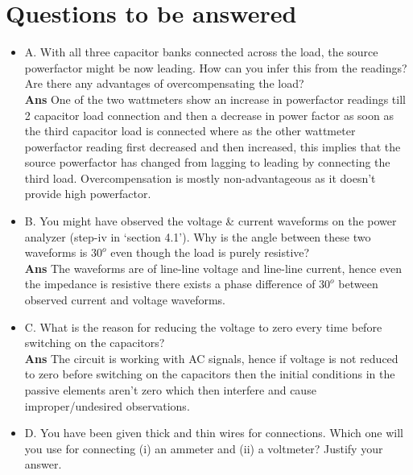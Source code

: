 \documentclass[12pt]{article}
\begin{document}
  \newpage
  
  
  \section{Questions to be answered}
  
  \begin{itemize}
      \item A. With all three capacitor banks connected across the load, the source powerfactor might be now leading. How can you infer this from the readings? Are there any advantages of overcompensating the load?\vspace{0.2cm} \\
      \textbf{Ans} One of the two wattmeters show an increase in powerfactor readings till 2 capacitor load connection and then a decrease in power factor as soon as the third capacitor load is connected where as the other wattmeter powerfactor reading first decreased and then increased, this implies that the source powerfactor has changed from lagging to leading by connecting the third load. Overcompensation is mostly non-advantageous as it doesn't provide high powerfactor.    
      \item B. You might have observed the voltage \& current waveforms on the power analyzer (step-iv in `section 4.1'). Why is the angle between these two waveforms is $30^o$ even though the load is purely resistive? \vspace{0.2cm} \\
      \textbf{Ans} The waveforms are of line-line voltage and line-line current, hence even the impedance is resistive there exists a phase difference of $30^o$ between observed current and voltage waveforms.
      \item C. What is the reason for reducing the voltage to zero every time before switching on the capacitors?\vspace{0.2cm} \\
      \textbf{Ans} The circuit is working with AC signals, hence if voltage is not reduced to zero before switching on the capacitors then the initial conditions in the passive elements aren't zero which then interfere and cause improper/undesired observations. 
      \item D. You have been given thick and thin wires for connections. Which one will you use for connecting (i) an ammeter and (ii) a voltmeter? Justify your answer.\vspace{0.2cm} \\

\end{itemize}
\end{document}
